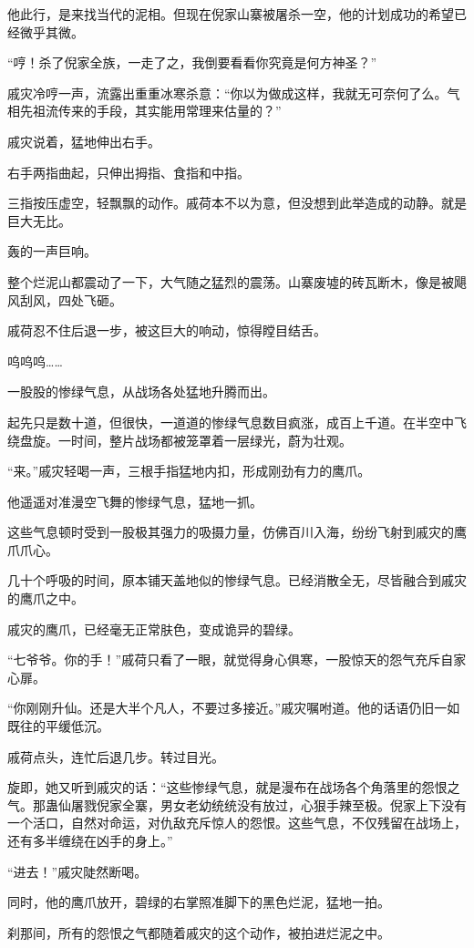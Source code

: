 \begin{this_body}
他此行，是来找当代的泥相。但现在倪家山寨被屠杀一空，他的计划成功的希望已经微乎其微。

“哼！杀了倪家全族，一走了之，我倒要看看你究竟是何方神圣？”

戚灾冷哼一声，流露出重重冰寒杀意：“你以为做成这样，我就无可奈何了么。气相先祖流传来的手段，其实能用常理来估量的？”

戚灾说着，猛地伸出右手。

右手两指曲起，只伸出拇指、食指和中指。

三指按压虚空，轻飘飘的动作。戚荷本不以为意，但没想到此举造成的动静。就是巨大无比。

轰的一声巨响。

整个烂泥山都震动了一下，大气随之猛烈的震荡。山寨废墟的砖瓦断木，像是被飓风刮风，四处飞砸。

戚荷忍不住后退一步，被这巨大的响动，惊得瞠目结舌。

呜呜呜……

一股股的惨绿气息，从战场各处猛地升腾而出。

起先只是数十道，但很快，一道道的惨绿气息数目疯涨，成百上千道。在半空中飞绕盘旋。一时间，整片战场都被笼罩着一层绿光，蔚为壮观。

“来。”戚灾轻喝一声，三根手指猛地内扣，形成刚劲有力的鹰爪。

他遥遥对准漫空飞舞的惨绿气息，猛地一抓。

这些气息顿时受到一股极其强力的吸摄力量，仿佛百川入海，纷纷飞射到戚灾的鹰爪爪心。

几十个呼吸的时间，原本铺天盖地似的惨绿气息。已经消散全无，尽皆融合到戚灾的鹰爪之中。

戚灾的鹰爪，已经毫无正常肤色，变成诡异的碧绿。

“七爷爷。你的手！”戚荷只看了一眼，就觉得身心俱寒，一股惊天的怨气充斥自家心扉。

“你刚刚升仙。还是大半个凡人，不要过多接近。”戚灾嘱咐道。他的话语仍旧一如既往的平缓低沉。

戚荷点头，连忙后退几步。转过目光。

旋即，她又听到戚灾的话：“这些惨绿气息，就是漫布在战场各个角落里的怨恨之气。那蛊仙屠戮倪家全寨，男女老幼统统没有放过，心狠手辣至极。倪家上下没有一个活口，自然对命运，对仇敌充斥惊人的怨恨。这些气息，不仅残留在战场上，还有多半缠绕在凶手的身上。”

“进去！”戚灾陡然断喝。

同时，他的鹰爪放开，碧绿的右掌照准脚下的黑色烂泥，猛地一拍。

刹那间，所有的怨恨之气都随着戚灾的这个动作，被拍进烂泥之中。


\end{this_body}
